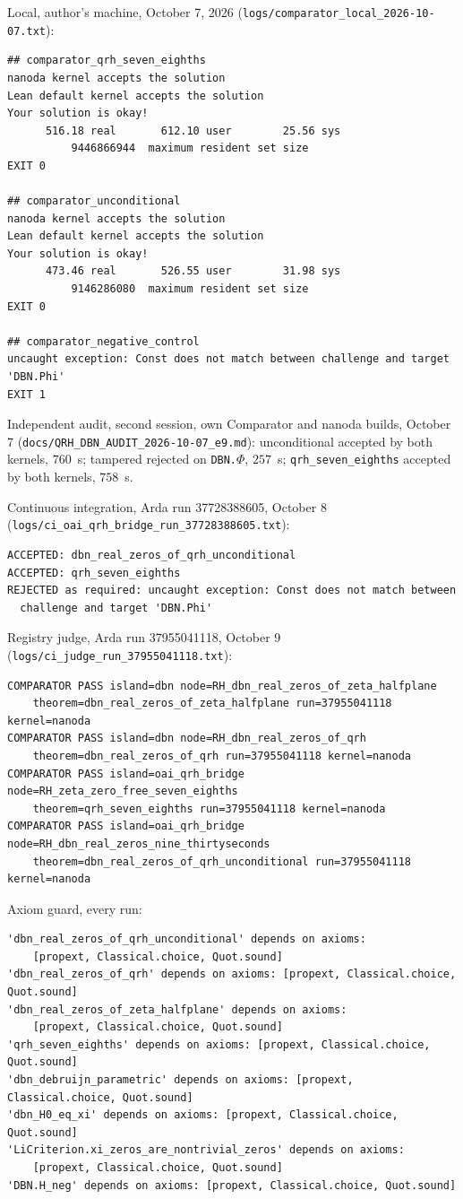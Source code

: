 \documentclass[11pt]{article}
\theoremstyle{definition}
\begin{document}
Local, author's machine, October 7, 2026 (\texttt{logs/comparator\_local\_2026-10-07.txt}):
\begin{verbatim}
## comparator_qrh_seven_eighths
nanoda kernel accepts the solution
Lean default kernel accepts the solution
Your solution is okay!
      516.18 real       612.10 user        25.56 sys
          9446866944  maximum resident set size
EXIT 0

## comparator_unconditional
nanoda kernel accepts the solution
Lean default kernel accepts the solution
Your solution is okay!
      473.46 real       526.55 user        31.98 sys
          9146286080  maximum resident set size
EXIT 0

## comparator_negative_control
uncaught exception: Const does not match between challenge and target 'DBN.Phi'
EXIT 1
\end{verbatim}

Independent audit, second session, own Comparator and nanoda builds, October 7 (\texttt{docs/QRH\_DBN\_AUDIT\_2026-10-07\_e9.md}): unconditional accepted by both kernels, $760$~s; tampered rejected on \texttt{DBN.$\Phi$}, $257$~s; \texttt{qrh\_seven\_eighths} accepted by both kernels, $758$~s.

Continuous integration, Arda run 37728388605, October 8 (\texttt{logs/ci\_oai\_qrh\_bridge\_run\_37728388605.txt}):
\begin{verbatim}
ACCEPTED: dbn_real_zeros_of_qrh_unconditional
ACCEPTED: qrh_seven_eighths
REJECTED as required: uncaught exception: Const does not match between
  challenge and target 'DBN.Phi'
\end{verbatim}

Registry judge, Arda run 37955041118, October 9 (\texttt{logs/ci\_judge\_run\_37955041118.txt}):
\begin{verbatim}
COMPARATOR PASS island=dbn node=RH_dbn_real_zeros_of_zeta_halfplane
    theorem=dbn_real_zeros_of_zeta_halfplane run=37955041118 kernel=nanoda
COMPARATOR PASS island=dbn node=RH_dbn_real_zeros_of_qrh
    theorem=dbn_real_zeros_of_qrh run=37955041118 kernel=nanoda
COMPARATOR PASS island=oai_qrh_bridge node=RH_zeta_zero_free_seven_eighths
    theorem=qrh_seven_eighths run=37955041118 kernel=nanoda
COMPARATOR PASS island=oai_qrh_bridge node=RH_dbn_real_zeros_nine_thirtyseconds
    theorem=dbn_real_zeros_of_qrh_unconditional run=37955041118 kernel=nanoda
\end{verbatim}

Axiom guard, every run:
\begin{verbatim}
'dbn_real_zeros_of_qrh_unconditional' depends on axioms:
    [propext, Classical.choice, Quot.sound]
'dbn_real_zeros_of_qrh' depends on axioms: [propext, Classical.choice, Quot.sound]
'dbn_real_zeros_of_zeta_halfplane' depends on axioms:
    [propext, Classical.choice, Quot.sound]
'qrh_seven_eighths' depends on axioms: [propext, Classical.choice, Quot.sound]
'dbn_debruijn_parametric' depends on axioms: [propext, Classical.choice, Quot.sound]
'dbn_H0_eq_xi' depends on axioms: [propext, Classical.choice, Quot.sound]
'LiCriterion.xi_zeros_are_nontrivial_zeros' depends on axioms:
    [propext, Classical.choice, Quot.sound]
'DBN.H_neg' depends on axioms: [propext, Classical.choice, Quot.sound]
\end{verbatim}
\end{document}
